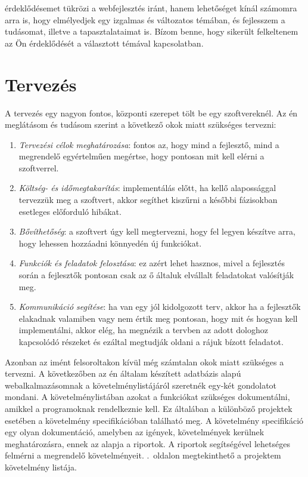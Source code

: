 \documentclass[]{thesis-ekf}
\theoremstyle{definition}
\theoremstyle{remark}
\begin{document}
érdeklődésemet tükrözi a webfejlesztés iránt, hanem lehetőséget kínál számomra arra is, hogy elmélyedjek egy izgalmas és változatos témában, és fejlesszem a tudásomat, illetve a tapasztalataimat is. Bízom benne, hogy sikerült felkeltenem az Ön érdeklődését a választott témával kapcsolatban. 
	
	\chapter{Tervezés}
		A tervezés egy nagyon fontos, központi szerepet tölt be egy szoftvereknél. Az én meglátásom és tudásom szerint a következő okok miatt szükséges tervezni:
		\begin{enumerate}
			\item \emph{Tervezési célok meghatározása}: fontos az, hogy mind a fejlesztő, mind a megrendelő egyértelműen megértse, hogy pontosan mit kell elérni a szoftverrel.
			\item \emph{Költség- és időmegtakarítás}: implementálás előtt, ha kellő alapossággal tervezzük meg a szoftvert, akkor segíthet kiszűrni a későbbi fázisokban esetleges előforduló hibákat. 
			\item \emph{Bővíthetőség}: a szoftvert úgy kell megtervezni, hogy fel legyen készítve arra, hogy lehessen hozzáadni könnyedén új funkciókat.
			\item \emph{Funkciók és feladatok felosztása}: ez azért lehet hasznos, mivel a fejlesztés során a fejlesztők pontosan csak az ő általuk elvállalt feladatokat valósítják meg.
			\item \emph{Kommunikáció segítése}: ha van egy jól kidolgozott terv, akkor ha a fejlesztők elakadnak valamiben vagy nem értik meg pontosan, hogy mit és hogyan kell implementálni, akkor elég, ha megnézik a tervben az adott dologhoz kapcsolódó részeket és ezáltal megtudják oldani a rájuk bízott feladatot.
		\end{enumerate}
		Azonban az imént felsoroltakon kívül még számtalan okok miatt szükséges a tervezni. A következőben az én általam készített adatbázis alapú webalkalmazásomnak a követelménylistájáról szeretnék egy-két gondolatot mondani. A követelménylistában azokat a funkciókat szükséges dokumentálni, amikkel a programoknak rendelkeznie kell. Ez általában a különböző projektek esetében a követelmény specifikációban található meg. A követelmény specifikáció egy olyan dokumentáció, amelyben az igények, követelmények kerülnek meghatározásra, ennek az alapja a riportok. A riportok segítségével lehetséges felmérni a megrendelő követelményeit. \Az{\pageref{kovetelmenylista}}.~oldalon megtekinthető a projektem követelmény listája.
		
\end{document}
